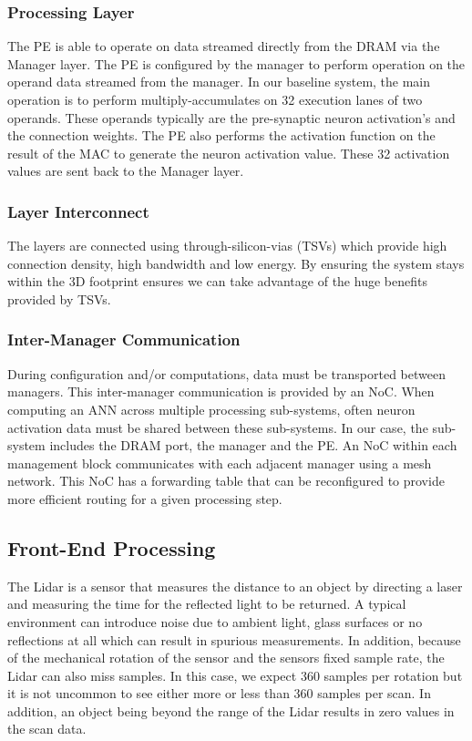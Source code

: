 \documentclass[journal]{IEEEtran}
\begin{document}
\subsubsection{Processing Layer}
The PE is able to operate on data streamed directly from the DRAM via the Manager layer. The PE is configured by the manager to perform operation on the operand data streamed from the manager. In our baseline system, the main operation is to perform multiply-accumulates on 32 execution lanes of two operands. These operands typically are the pre-synaptic neuron activation's and the connection weights. The PE also performs the activation function on the result of the MAC to generate the neuron activation value. These 32 activation values are sent back to the Manager layer.

\subsubsection{Layer Interconnect}

The layers are connected using through-silicon-vias (TSVs) which provide high connection density, high bandwidth and low energy.
By ensuring the system stays within the 3D footprint ensures we can take advantage of the huge benefits provided by TSVs.

\subsubsection{Inter-Manager Communication}

During configuration and/or computations, data must be transported between managers. This inter-manager communication is provided by an NoC.
When computing an ANN across multiple processing sub-systems, often neuron activation data must be shared between these sub-systems. In our case, the sub-system includes the DRAM port, the manager and the PE. An NoC within each management block communicates with each adjacent manager using a mesh network. This NoC has a forwarding table that can be reconfigured to provide more efficient routing for a given processing step.

\subsection{Front-End Processing}
\label{sec:Front-End Processing}
The Lidar is a sensor that measures the distance to an object by directing a laser and measuring the time for the reflected light to be returned.
A typical environment can introduce noise due to ambient light, glass surfaces or no reflections at all which can result in spurious measurements.
In addition, because of the mechanical rotation of the sensor and the sensors fixed sample rate, the Lidar can also miss samples.
In this case, we expect 360 samples per rotation but it is not uncommon to see either more or less than 360 samples per scan.
In addition, an object being beyond the range of the Lidar results in zero values in the scan data.
\end{document}
